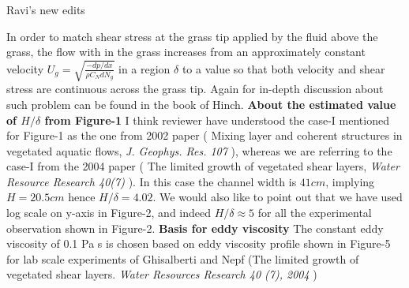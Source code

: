 \documentclass[letterpaper,10pt]{article}
\begin{document}
\centerline{Ravi's new edits}

In order to match shear stress at the grass tip applied by the fluid above the grass, the flow with in the grass increases from an approximately constant velocity $U_g = \sqrt{\frac{-dp/dx}{\rho C_N d N_g}}$ in a region $\delta$ to a value so that both velocity and shear stress are continuous across the grass tip. Again for in-depth discussion about such problem can be found in the book of Hinch.   
\newline
\textbf{About the estimated value of $H/\delta$ from Figure-1}
\newline
I think reviewer have understood the case-I mentioned for Figure-1 as the one from 2002 paper ( Mixing layer and coherent structures in vegetated aquatic flows, \textit{J. Geophys. Res. 107} ), whereas we are referring to the case-I from the 2004 paper ( The limited growth of vegetated shear layers, \textit{Water Resource Research 40(7)} ). In this case the channel width is $41cm$, implying $H=20.5 cm$ hence $H/\delta=4.02$. We would also like to point out that we have used log scale on y-axis in Figure-2, and indeed $H/\delta \approx 5$ for all the experimental observation shown in Figure-2.
\newline
\textbf{Basis for eddy viscosity}
\newline
The constant eddy viscosity of 0.1 Pa s is chosen based on eddy viscosity profile shown in Figure-5 for lab scale experiments of Ghisalberti and Nepf (The limited growth of vegetated shear layers. \textit{Water Resources Research 40 (7), 2004} )
\end{document}
